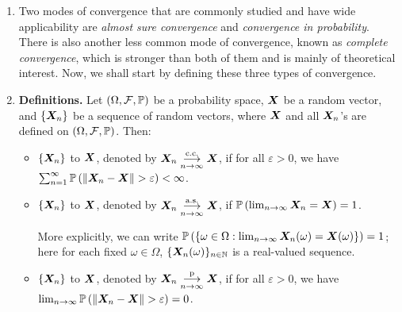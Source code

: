 \begin{enumerate}
\item Two modes of convergence that are commonly studied and have wide
applicability are \emph{almost sure convergence} and \emph{convergence in
probability}. There is also another less common mode of convergence, known as
\emph{complete convergence}, which is stronger than both of them and is mainly
of theoretical interest.  Now, we shall start by defining these three types of
convergence.
\item \textbf{Definitions.} Let \((\Omega,\mathcal{F},\mathbb{P})\) be a probability
space, \(\bm{X}\) be a random vector, and \(\{\bm{X}_n\}\) be a sequence of
random vectors, where \(\bm{X}\) and all \(\bm{X}_n\)'s are defined on
\((\Omega,\mathcal{F},\mathbb{P})\). Then:
\begin{itemize}
\item \(\{\bm{X}_n\}\)  to \(\bm{X}\), denoted by
\(\bm{X}_n\underset{n\to\infty}{\overset{\text{c.c.}}{\longrightarrow}} \bm{X}\), if for all \(\varepsilon>0\), we have \\
\(\sum_{n=1}^{\infty}\mathbb{P}\left(\|\bm{X}_n-\bm{X}\| >\varepsilon\right)<\infty\).
\item \(\{\bm{X}_n\}\)  to \(\bm{X}\), denoted by
\(\bm{X}_n\underset{n\to\infty}{\overset{\text{a.s.}}{\longrightarrow}} \bm{X}\), if \(\mathbb{P}\left(\lim_{n\to\infty}\bm{X}_n=\bm{X}\right)=1\).
\begin{note}
More explicitly, we can write
\(\mathbb{P}\left(\{\omega\in\Omega:\lim_{n\to\infty}\bm{X}_n(\omega)=\bm{X}(\omega)\}\right)=1\);
here for each fixed \(\omega\in\Omega\), \(\{\bm{X}_n(\omega)\}_{n\in\mathbb{N}}\) is
a real-valued sequence.
\end{note}
\item \(\{\bm{X}_n\}\)  to \(\bm{X}\), denoted by
\(\bm{X}_n\underset{n\to\infty}{\overset{\text{p}}{\longrightarrow}} \bm{X}\), if for all \(\varepsilon>0\), we have
\(\lim_{n\to\infty}\prob{\|\vect{X}_n-\vect{X}\|>\varepsilon}=0\).


\end{itemize}
\end{enumerate}
